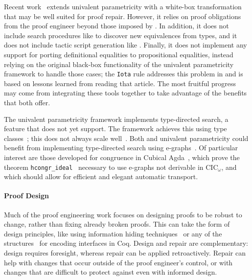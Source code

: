 Recent work~\cite{tabareau2019marriage} extends univalent parametricity with 
a white-box transformation that may be well suited for proof repair.
However, it relies on proof obligations from the proof engineer beyond those imposed by \toolname.
In addition, it does not include search procedures like \toolname to discover new equivalences from types,
and it does not include tactic script generation like \toolname.
Finally, it does not implement any support for porting definitional equalities to propositional equalities,
instead relying on the original black-box functionality of the univalent parametricity framework to handle those cases;
the \lstinline{Iota} rule addresses this problem in \toolname and is based on lessons learned from reading that article.
The most fruitful progress may come from integrating these tools together to take advantage of the benefits that both offer.

The univalent parametricity framework implements type-directed search, a feature that \toolname does not yet support.
The framework achieves this using type classes~\cite{Sozeau2008}; this does not always scale well~\cite{tabareau2019marriage}.
Both \toolname and univalent parametricity could benefit from implementing type-directed search using e-graphs~\cite{egraph1}.
Of particular interest are those developed for congruence in Cubical Agda~\cite{egraph6},
which prove the theorem \lstinline{hcongr_ideal}~\cite{egraph7} necessary to use e-graphs not derivable in CIC$_{\omega}$,
and which should allow for efficient and elegant automatic transport.

\paragraph{Proof Design}

Much of the proof engineering work focuses on designing proofs
to be robust to change, rather than fixing already broken proofs.
This can take the form of design principles, like using 
information hiding techniques~\cite{Woos:2016:PCF:2854065.2854081, Klein:2014:CFV:2584468.2560537}
or any of the structures~\cite{Chrzaszcz2003, Sozeau2008, Saibi:PhD} for encoding interfaces in Coq.
Design and repair are complementary: design requires foresight, whereas repair can be applied retroactively.
Repair can help with changes that occur outside of the proof engineer's control,
or with changes that are difficult to protect against even with informed design.

